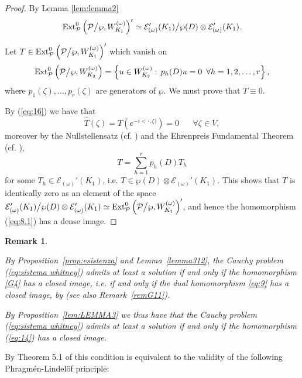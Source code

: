 \documentclass[twoside]{amsart}
\newtheorem{Rem}[Th]{Remark}
\begin{document}
\begin{proof}
By Lemma \ref{lem:lemma2} 
\[
{\mathop{\rm Ext}\nolimits}_{{\mathcal P}}^{0}\left({\mathcal P}\bigl/\wp,W_{K_{1}}^{(\omega)}\right)'
\simeq{\mathcal{E}}_{(\omega)}'(K_{1})\bigl/\wp(D)\otimes{\mathcal{E}}_{(\omega)}'(K_{1}).
\]

Let $T\in{\mathop{\rm Ext}\nolimits}_{{\mathcal P}}^{0}\left({\mathcal P}\bigl/\wp,W_{K_{1}}^{(\omega)}
\right)'$
which vanish on 
\[
{\mathop{\rm Ext}\nolimits}_{{\mathcal P}}^{0}\left({\mathcal P}\bigl/\wp,W_{K_{2}}^{(\omega)}\right)=
\left\{ u\in W_{K_{2}}^{(\omega)}:\,p_{h}(D)u=0\,\,\,\forall h=1,2,\ldots,r
\right\},
\]
where $p_1(\zeta),\ldots,p_r(\zeta)$ are generators of $\wp$.
We must prove that $T\equiv0$.

By (\ref{eq:16}) we have that 
\[
\hat{T}(\zeta)=T(e^{-i<\cdot,\zeta)})=0\,\,\,\,\,\,\,\,\,\,\forall\zeta\in V,
\]
moreover by the Nullstellensatz (cf. \cite{T}) and the 
Ehrenpreis Fundamental Theorem (cf. \cite{H3}),
\[
T=\sum_{h=1}^{r}p_{h}(D)T_{h}
\]
for some $T_{h}\in{\mathcal{E}}_{(\omega)}'(K_{1})$, i.e. 
$T\in\wp(D)\otimes{\mathcal{E}}_{(\omega)}'(K_{1})$.
This shows that $T$ is identically zero as an element of the space
${\mathcal{E}}_{(\omega)}'(K_{1})\bigl/\wp(D)\otimes{\mathcal{E}}_{(\omega)}'(K_{1})\simeq
{\mathop{\rm Ext}\nolimits}_{{\mathcal P}}^{0}\left({\mathcal P}\bigl/\wp,W_{K_{1}}^{(\omega)}\right)'$,
and hence the homomorphism (\ref{eq:8.1}) has a dense image.
\end{proof}

\begin{Rem}
  \label{remG9}
  \begin{em}
    By Proposition~\ref{prop:esistenza} and Lemma~\ref{lemma312},
the Cauchy problem (\ref{eq:sistema whitney}) admits at least
a solution if and only if the homomorphism \eqref{G4} has a closed image,
i.e. if and only if the dual homomorphism \eqref{eq:9} has a closed
image, by \cite[Ch.~IV, \S~2, n.~4, Thm.~3]{Gr}
(see also Remark~\ref{remG11}).

By Proposition~\ref{lem:LEMMA3} we thus have that the Cauchy problem
(\ref{eq:sistema whitney}) admits at least a solution if and only if
the homomorphism (\ref{eq:14}) has a closed image.
  \end{em}
\end{Rem}

By Theorem 5.1 of \cite{BN3} this condition is equivalent
to the validity of the following Phragm\'en-Lindel\"{o}f principle:
\end{document}
